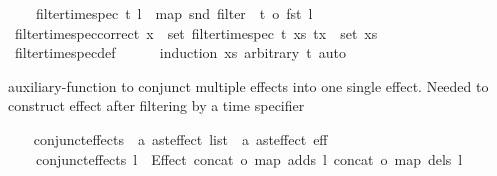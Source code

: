 \begin{isabellebody}
\ \ \ \ {\isachardoublequoteopen}filter{\isacharunderscore}{\kern0pt}time{\isacharunderscore}{\kern0pt}spec\ t\ l\ {\isacharequal}{\kern0pt}\ map\ snd\ {\isacharparenleft}{\kern0pt}filter\ {\isacharparenleft}{\kern0pt}{\isacharparenleft}{\kern0pt}{\isacharparenleft}{\kern0pt}{\isacharequal}{\kern0pt}{\isacharparenright}{\kern0pt}\ t{\isacharparenright}{\kern0pt}\ o\ fst{\isacharparenright}{\kern0pt}\ l{\isacharparenright}{\kern0pt}{\isachardoublequoteclose}\isanewline
\isanewline
\ \ \isamarkupfalse%
\ filter{\isacharunderscore}{\kern0pt}time{\isacharunderscore}{\kern0pt}spec{\isacharunderscore}{\kern0pt}correct{\isacharcolon}{\kern0pt}\ {\isachardoublequoteopen}{\isasymforall}x\ {\isasymin}\ set\ {\isacharparenleft}{\kern0pt}filter{\isacharunderscore}{\kern0pt}time{\isacharunderscore}{\kern0pt}spec\ t\ xs{\isacharparenright}{\kern0pt}{\isachardot}{\kern0pt}\ {\isacharparenleft}{\kern0pt}t{\isacharcomma}{\kern0pt}x{\isacharparenright}{\kern0pt}\ {\isasymin}\ set\ xs{\isachardoublequoteclose}\isanewline
%
\isadelimproof
\ \ \ \ %
\endisadelimproof
%
\isatagproof
{}\isamarkupfalse%
\ filter{\isacharunderscore}{\kern0pt}time{\isacharunderscore}{\kern0pt}spec{\isacharunderscore}{\kern0pt}def\isanewline
\ \ \ \ \isamarkupfalse%
\ {\isacharparenleft}{\kern0pt}induction\ xs\ arbitrary{\isacharcolon}{\kern0pt}\ t{\isacharparenright}{\kern0pt}\ auto%
\endisatagproof
{\isafoldproof}%
%
\isadelimproof
%
\endisadelimproof
%
\begin{isamarkuptext}%
auxiliary-function to conjunct multiple effects into one single effect. 
  Needed to construct effect after filtering by a time specifier%
\end{isamarkuptext}\isamarkuptrue%
\ \ \isamarkupfalse%
\ conjunct{\isacharunderscore}{\kern0pt}effects\ {\isacharcolon}{\kern0pt}{\isacharcolon}{\kern0pt}\ {\isachardoublequoteopen}{\isacharparenleft}{\kern0pt}{\isacharprime}{\kern0pt}a\ ast{\isacharunderscore}{\kern0pt}effect{\isacharparenright}{\kern0pt}\ list\ {\isasymRightarrow}\ {\isacharprime}{\kern0pt}a\ ast{\isacharunderscore}{\kern0pt}effect{\isachardoublequoteclose}\ {\isacharparenleft}{\kern0pt}{\isachardoublequoteopen}{\isasymAnd}\isactrlsub e\isactrlsub f\isactrlsub f\ {\isacharunderscore}{\kern0pt}{\isachardoublequoteclose}\ {\isacharbrackleft}{\kern0pt}{}{}{\isacharbrackright}{\kern0pt}\ {}{}{\isacharparenright}{\kern0pt}\ \isanewline
\ \ \ \ {\isachardoublequoteopen}conjunct{\isacharunderscore}{\kern0pt}effects\ l\ {\isacharequal}{\kern0pt}\ Effect\ {\isacharparenleft}{\kern0pt}{\isacharparenleft}{\kern0pt}concat\ o\ {\isacharparenleft}{\kern0pt}map\ adds{\isacharparenright}{\kern0pt}{\isacharparenright}{\kern0pt}\ l{\isacharparenright}{\kern0pt}\ {\isacharparenleft}{\kern0pt}{\isacharparenleft}{\kern0pt}concat\ o\ {\isacharparenleft}{\kern0pt}map\ dels{\isacharparenright}{\kern0pt}{\isacharparenright}{\kern0pt}\ l{\isacharparenright}{\kern0pt}{\isachardoublequoteclose}%

\end{isabellebody}

